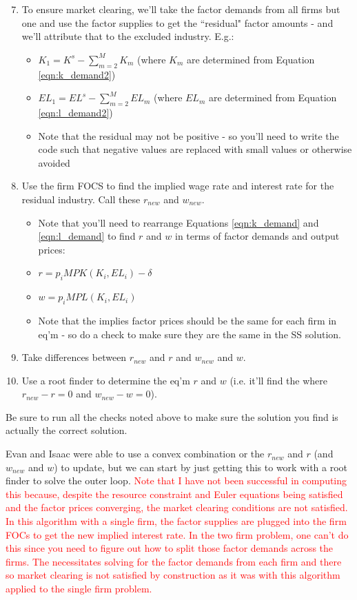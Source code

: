 \documentclass[letterpaper,12pt]{article}
\theoremstyle{definition}
\begin{document}
\begin{spacing}{1.5}
\begin{enumerate}
\setcounter{enumi}{6}
\item To ensure market clearing, we'll take the factor demands from all firms but one and use the factor supplies to get the ``residual" factor amounts - and we'll attribute that to the excluded industry.  E.g.:
	\begin{itemize}
	\item $K_{1} = K^{s} - \sum_{m=2}^{M}K_{m}$ (where $K_{m}$ are determined from Equation \ref{eqn:k_demand2})
	\item $EL_{1} = {EL}^{s} - \sum_{m=2}^{M}EL_{m}$ (where $EL_{m}$ are determined from Equation \ref{eqn:l_demand2})
	\item Note that the residual may not be positive - so you'll need to write the code such that negative values are replaced with small values or otherwise avoided
	\end{itemize}
\item Use the firm FOCS to find the implied wage rate and interest rate for the residual industry. Call these $r_{new}$ and $w_{new}$.
	\begin{itemize}
	\item Note that you'll need to rearrange Equations \ref{eqn:k_demand} and \ref{eqn:l_demand} to find $r$ and $w$ in terms of factor demands and output prices:
	\item $r = p_{i} MPK(K_{i},EL_{i}) - \delta$
	\item $w = p_{i} MPL(K_{i},EL_{i}) $
	\item Note that the implies factor prices should be the same for each firm in eq'm - so do a check to make sure they are the same in the SS solution.
	\end{itemize}
\item Take differences between $r_{new}$ and $r$ and $w_{new}$ and $w$.
\item Use a root finder to determine the eq'm $r$ and $w$ (i.e. it'll find the where $r_{new}-r=0$ and $w_{new}-w=0$).
\end{enumerate}

Be sure to run all the checks noted above to make sure the solution you find is actually the correct solution.

Evan and Isaac were able to use a convex combination or the $r_{new}$ and $r$ (and $w_{new}$ and $w$) to update, but we can start by just getting this to work with a root finder to solve the outer loop.  \textcolor{red}{Note that I have not been successful in computing this because, despite the resource constraint and Euler equations being satisfied and the factor prices converging, the market clearing conditions are not satisfied.  In this algorithm with a single firm, the factor supplies are plugged into the firm FOCs to get the new implied interest rate.  In the two firm problem, one can't do this since you need to figure out how to split those factor demands across the firms.  The necessitates solving for the factor demands from each firm and there so market clearing is not satisfied by construction as it was with this algorithm applied to the single firm problem.}


\end{spacing}
\end{document}
